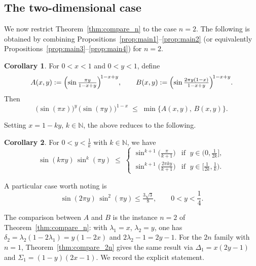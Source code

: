 \documentclass[12pt]{amsart}
\theoremstyle{definition}
\newtheorem{corollary}{Corollary}[section]
\begin{document}
\subsection{The two-dimensional case}\label{sec:2D}

We now restrict Theorem~\ref{thm:compare_n} to the case $n=2$.
The following is obtained by combining
Propositions~\ref{prop:main1}--\ref{prop:main2} (or equivalently
Propositions~\ref{prop:main3}--\ref{prop:main4}) for $n=2$.

\begin{corollary}\label{cor:main12}
For $0<x<1$ and $0<y<1$, define
\[
  A(x,y):=\Bigl(\sin\tfrac{\pi y}{1-x+y}\Bigr)^{\!1-x+y},
  \qquad
  B(x,y):=\Bigl(\sin\tfrac{2\pi y(1-x)}{1-x+y}\Bigr)^{\!1-x+y}.
\]
Then
\begin{equation}\label{eq:main12}
  \bigl(\sin(\pi x)\bigr)^y\,\bigl(\sin(\pi y)\bigr)^{1-x}
  \;\leq\;\min\{A(x,y),\,B(x,y)\}.
\end{equation}
\end{corollary}

Setting $x=1-ky$, $k\in\mathbb{N}$, the above reduces to the following.

\begin{corollary}\label{cor:main121}
For $0<y<\frac{1}{k}$ with $k\in\mathbb{N}$, we have
\begin{equation}\label{eq:cormain121}
  \sin(k\pi y)\,\sin^k(\pi y)
  \;\leq\; \begin{cases}
   \sin^{k+1}\!\bigl(\tfrac {\pi }{k+1}\bigr) &  \text{if }\; y\in (0,\frac{1}{2k}],\\[4pt]
        \sin^{k+1}\!\bigl(\tfrac{2\pi ky}{k+1}\bigr) & \text{if }\;y\in [\frac{1}{2k},\frac{1}{k}).
 \end{cases}
\end{equation}
\end{corollary}

A particular case worth noting is
\begin{equation}\label{eq:ysinineq}
  \sin(2\pi y)\,\sin^2(\pi y)\leq
  \tfrac{3\sqrt3}{8}, \qquad 0< y<\frac{1}{4}.
\end{equation}

The comparison between $A$ and $B$ is the instance $n=2$ of
Theorem~\ref{thm:compare_n}: with $\lambda_1=x$, $\lambda_2=y$,
one has $\delta_2=\lambda_2(1-2\lambda_1)=y(1-2x)$ and
$2\lambda_2-1=2y-1$.  For the $2n$ family with $n=1$, Theorem~\ref{thm:compare_2n}
gives the same result via $\Delta_1=x(2y-1)$ and $\Sigma_1=(1-y)(2x-1)$.
We record the explicit statement.
\end{document}
